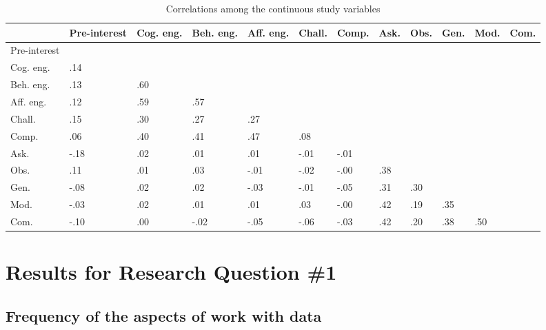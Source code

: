 \documentclass[]{book}
\theoremstyle{definition}
\theoremstyle{definition}
\theoremstyle{definition}
\theoremstyle{remark}
\begin{document}
\begin{landscape}\begin{table}

\caption{\label{tab:unnamed-chunk-8}Correlations among the continuous study variables}
\centering
\begin{tabular}[t]{l>{\raggedright\arraybackslash}p{3em}>{\raggedright\arraybackslash}p{3em}>{\raggedright\arraybackslash}p{3em}>{\raggedright\arraybackslash}p{3em}>{\raggedright\arraybackslash}p{3em}>{\raggedright\arraybackslash}p{3em}>{\raggedright\arraybackslash}p{3em}>{\raggedright\arraybackslash}p{3em}>{\raggedright\arraybackslash}p{3em}>{\raggedright\arraybackslash}p{3em}>{\raggedright\arraybackslash}p{3em}}
\toprule
 & Pre-interest & Cog. eng. & Beh. eng. & Aff. eng. & Chall. & Comp. & Ask. & Obs. & Gen. & Mod. & Com.\\
\midrule
Pre-interest &  &  &  &  &  &  &  &  &  &  & \\
Cog. eng. & .14 &  &  &  &  &  &  &  &  &  & \\
Beh. eng. & .13 & .60 &  &  &  &  &  &  &  &  & \\
Aff. eng. & .12 & .59 & .57 &  &  &  &  &  &  &  & \\
Chall. & .15 & .30 & .27 & .27 &  &  &  &  &  &  & \\
Comp. & .06 & .40 & .41 & .47 & .08 &  &  &  &  &  & \\
Ask. & -.18 & .02 & .01 & .01 & -.01 & -.01 &  &  &  &  & \\
Obs. & .11 & .01 & .03 & -.01 & -.02 & -.00 & .38 &  &  &  & \\
Gen. & -.08 & .02 & .02 & -.03 & -.01 & -.05 & .31 & .30 &  &  & \\
Mod. & -.03 & .02 & .01 & .01 & .03 & -.00 & .42 & .19 & .35 &  & \\
Com. & -.10 & .00 & -.02 & -.05 & -.06 & -.03 & .42 & .20 & .38 & .50 & \\
\bottomrule
\end{tabular}
\end{table}
\end{landscape}

\section{Results for Research Question
\#1}\label{results-for-research-question-1}

\subsection{Frequency of the aspects of work with
data}\label{frequency-of-the-aspects-of-work-with-data}
\end{document}

